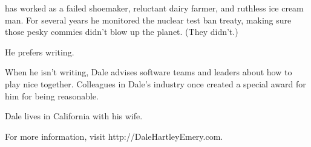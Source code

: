 \nextrectopage
{}

\skipline
{}
has worked as a failed shoemaker,
reluctant dairy farmer,
and ruthless ice cream man.
For several years
he monitored the nuclear test ban treaty,
making sure those pesky commies didn’t blow up the planet.
(They didn’t.)

He prefers writing.

When he isn’t writing,
Dale advises software teams and leaders
about how to play nice together.
Colleagues in Dale’s industry
once created a special award for him
for being reasonable.

Dale lives in California with his wife.

For more information,
visit http://DaleHartleyEmery.com.
